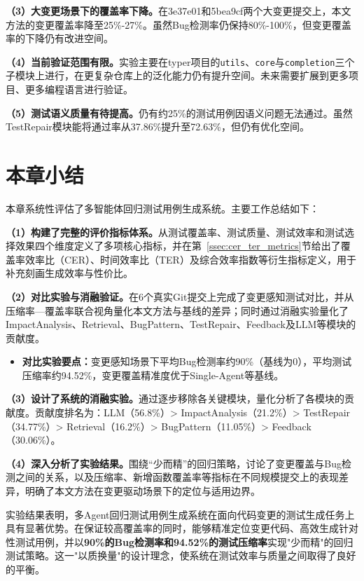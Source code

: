 \textbf{（3）大变更场景下的覆盖率下降。}在3e37e01和5bea9cf两个大变更提交上，本文方法的变更覆盖率降至25\%-27\%。虽然Bug检测率仍保持80\%-100\%，但变更覆盖率的下降仍有改进空间。

\textbf{（4）当前验证范围有限。}实验主要在typer项目的\texttt{utils}、\texttt{core}与\texttt{completion}三个子模块上进行，在更复杂仓库上的泛化能力仍有提升空间。未来需要扩展到更多项目、更多编程语言进行验证。

\textbf{（5）测试语义质量有待提高。}仍有约25\%的测试用例因语义问题无法通过。虽然TestRepair模块能将通过率从37.86\%提升至72.63\%，但仍有优化空间。

\section{本章小结}
\label{sec:chapter_summary}

本章系统性评估了多智能体回归测试用例生成系统。主要工作总结如下：

\textbf{（1）构建了完整的评价指标体系。}从测试覆盖率、测试质量、测试效率和测试选择效果四个维度定义了多项核心指标，并在第~\ref{ssec:cer_ter_metrics}节给出了覆盖率效率比（CER）、时间效率比（TER）及综合效率指数等衍生指标定义，用于补充刻画生成效率与性价比。

\textbf{（2）对比实验与消融验证。}在6个真实Git提交上完成了变更感知测试对比，并从压缩率—覆盖率联合视角量化本文方法与基线的差异；同时通过消融实验量化了ImpactAnalysis、Retrieval、BugPattern、TestRepair、Feedback及LLM等模块的贡献度。

\begin{itemize}
    \item \textbf{对比实验要点：}变更感知场景下平均Bug检测率约90\%（基线为0），平均测试压缩率约94.52\%，变更覆盖精准度优于Single-Agent等基线。
\end{itemize}

\textbf{（3）设计了系统的消融实验。}通过逐步移除各关键模块，量化分析了各模块的贡献度。贡献度排名为：LLM（56.8\%）> ImpactAnalysis（21.2\%）> TestRepair（34.77\%）> Retrieval（16.2\%）> BugPattern（11.05\%）> Feedback（30.06\%）。

\textbf{（4）深入分析了实验结果。}围绕``少而精''的回归策略，讨论了变更覆盖与Bug检测之间的关系，以及压缩率、新增函数覆盖率等指标在不同规模提交上的表现差异，明确了本文方法在变更驱动场景下的定位与适用边界。

实验结果表明，多Agent回归测试用例生成系统在面向代码变更的测试生成任务上具有显著优势。在保证较高覆盖率的同时，能够精准定位变更代码、高效生成针对性测试用例，并以\textbf{90\%的Bug检测率和94.52\%的测试压缩率}实现"少而精"的回归测试策略。这一"以质换量"的设计理念，使系统在测试效率与质量之间取得了良好的平衡。
